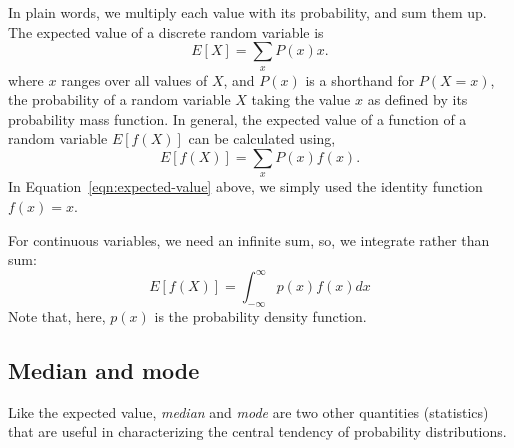 In plain words, we multiply each value with its probability,
and sum them up.%
The expected value of a discrete random variable is 
\begin{equation}\label{eqn:expected-value}
  E[X] = \sum_{x} P(x) x .
\end{equation}
where $x$ ranges over all values of $X$,
and $P(x)$ is a shorthand for $P(X=x)$,
the probability of a random variable $X$ taking the value $x$
as defined by its probability mass function.
In general, the expected value of a function of a random variable
$E[f(X)]$ can be calculated using,
\begin{equation}\label{eqn:expected-value-function}
  E\left[f(X)\right] = \sum_{x} P(x) f(x) .
\end{equation}
In Equation~\ref{eqn:expected-value} above,
we simply used the identity function $f(x) = x$.

For continuous variables,
we need an infinite sum, so, we integrate rather than sum:
\[
  E\left[f(X)\right] = \int_{-\infty}^{\infty} p(x) f(x) dx
\]
Note that, here, $p(x)$ is the probability density function.


\subsection{Median and mode}

Like the expected value,
\emph{median} and \emph{mode} are two other quantities (statistics)
that are useful in characterizing the central tendency of probability distributions.

